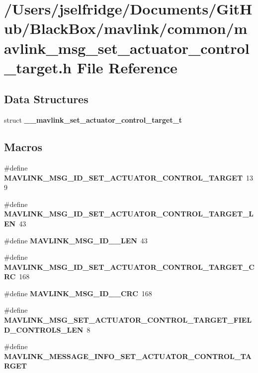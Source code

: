 \section{/\+Users/jselfridge/\+Documents/\+Git\+Hub/\+Black\+Box/mavlink/common/mavlink\+\_\+msg\+\_\+set\+\_\+actuator\+\_\+control\+\_\+target.h File Reference}
\label{mavlink__msg__set__actuator__control__target_8h}
\subsection*{Data Structures}
\begin{DoxyCompactItemize}
\item 
struct \textbf{ \+\_\+\+\_\+mavlink\+\_\+set\+\_\+actuator\+\_\+control\+\_\+target\+\_\+t}
\end{DoxyCompactItemize}
\subsection*{Macros}
\begin{DoxyCompactItemize}
\item 
\#define \textbf{ M\+A\+V\+L\+I\+N\+K\+\_\+\+M\+S\+G\+\_\+\+I\+D\+\_\+\+S\+E\+T\+\_\+\+A\+C\+T\+U\+A\+T\+O\+R\+\_\+\+C\+O\+N\+T\+R\+O\+L\+\_\+\+T\+A\+R\+G\+ET}~139
\item 
\#define \textbf{ M\+A\+V\+L\+I\+N\+K\+\_\+\+M\+S\+G\+\_\+\+I\+D\+\_\+\+S\+E\+T\+\_\+\+A\+C\+T\+U\+A\+T\+O\+R\+\_\+\+C\+O\+N\+T\+R\+O\+L\+\_\+\+T\+A\+R\+G\+E\+T\+\_\+\+L\+EN}~43
\item 
\#define \textbf{ M\+A\+V\+L\+I\+N\+K\+\_\+\+M\+S\+G\+\_\+\+I\+D\+\_\+\_\+\+L\+EN}~43
\item 
\#define \textbf{ M\+A\+V\+L\+I\+N\+K\+\_\+\+M\+S\+G\+\_\+\+I\+D\+\_\+\+S\+E\+T\+\_\+\+A\+C\+T\+U\+A\+T\+O\+R\+\_\+\+C\+O\+N\+T\+R\+O\+L\+\_\+\+T\+A\+R\+G\+E\+T\+\_\+\+C\+RC}~168
\item 
\#define \textbf{ M\+A\+V\+L\+I\+N\+K\+\_\+\+M\+S\+G\+\_\+\+I\+D\+\_\+\_\+\+C\+RC}~168
\item 
\#define \textbf{ M\+A\+V\+L\+I\+N\+K\+\_\+\+M\+S\+G\+\_\+\+S\+E\+T\+\_\+\+A\+C\+T\+U\+A\+T\+O\+R\+\_\+\+C\+O\+N\+T\+R\+O\+L\+\_\+\+T\+A\+R\+G\+E\+T\+\_\+\+F\+I\+E\+L\+D\+\_\+\+C\+O\+N\+T\+R\+O\+L\+S\+\_\+\+L\+EN}~8
\item 
\#define \textbf{ M\+A\+V\+L\+I\+N\+K\+\_\+\+M\+E\+S\+S\+A\+G\+E\+\_\+\+I\+N\+F\+O\+\_\+\+S\+E\+T\+\_\+\+A\+C\+T\+U\+A\+T\+O\+R\+\_\+\+C\+O\+N\+T\+R\+O\+L\+\_\+\+T\+A\+R\+G\+ET}
\end{DoxyCompactItemize}
